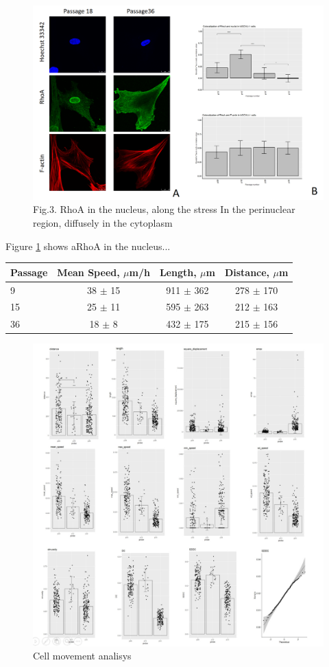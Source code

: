 \documentclass[a4paper,12pt]{article}
\begin{document}
\begin{figure}
  \includegraphics[width=0.8\linewidth]{fig3.png}
  \caption{Fig.3. RhoA in the nucleus, along the stress In the perinuclear region, diffusely in the cytoplasm}
  \label{fig:fig3}
  \centering
\end{figure}

Figure \ref{fig:fig3} shows aRhoA in the nucleus...

\begin{table}
\centering
\begin{tabular}{|l|c|c|c|}
 \hline
 Passage & Mean Speed, $\mu$m/h & Length, $\mu$m  & Distance, $\mu$m \\
 \hline
 9 & 38 $\pm$ 15 & 911 $\pm$ 362 &  278 $\pm$ 170 \\
 15 & 25 $\pm$ 11 & 595 $\pm$ 263 & 212 $\pm$ 163  \\
 36 & 18 $\pm$ 8 & 432 $\pm$ 175 & 215 $\pm$ 156 \\
 \hline
\end{tabular}
\end{table}

\begin{figure}
  \includegraphics[width=0.9\linewidth]{fig8.png}
  \caption{Cell movement analisys}
  \label{fig:fig8}
  \centering
\end{figure}
\end{document}
